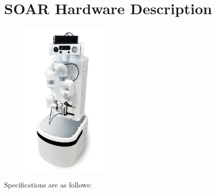 
\section*{SOAR Hardware Description}%
\label{sec:annex-OPL}

\setlength\intextsep{0pt}
\begin{figure}
	\centering
	\includegraphics[width=0.4\textwidth]{images/soar.png}
	\label{fig:soar}
\end{figure}

Specifications are as follows:

